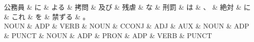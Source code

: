 \documentclass[tikz,border=5pt]{standalone}
\begin{document}
\normalsize
\begin{dependency}[edge unit distance=12.0pt]
    \begin{deptext}[column sep=1em]
        公務員 \& に \& よる \& 拷問 \& 及び \& 残虐 \& な \& 刑罰 \& は \& 、 \& 絶対 \& に \& これ \& を \& 禁ずる \& 。\\
        NOUN \& ADP \& VERB \& NOUN \& CCONJ \& ADJ \& AUX \& NOUN \& ADP \& PUNCT \& NOUN \& ADP \& PRON \& ADP \& VERB \& PUNCT\\
    \end{deptext}
\end{dependency}
\end{document}
